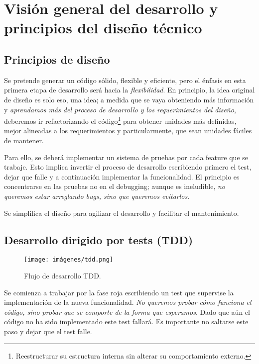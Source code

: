 
\section{Visión general del desarrollo y principios del diseño técnico}\label{principios:vision-general-desarrollo}

\subsection{Principios de diseño}\label{principios:principios-de-diseno}
Se pretende generar un código sólido, flexible y eficiente, pero el énfasis en esta primera etapa de desarrollo será hacia la \emph{flexibilidad}. En principio, la idea original de diseño es solo eso, una idea; a medida que se vaya obteniendo más información y \emph{aprendamos más del proceso de desarrollo y los requerimientos del diseño}, deberemos ir refactorizando el código\footnote{Reestructurar su estructura interna sin alterar su comportamiento externo.} para obtener unidades más definidas, mejor alineadas a los requerimientos y particularmente, que sean unidades fáciles de mantener.

Para ello, se deberá implementar un sistema de pruebas por cada feature que se trabaje. Esto implica invertir el proceso de desarrollo escribiendo primero el test, dejar que falle y a continuación implementar la funcionalidad. El principio es concentrarse en las pruebas no en el \foreignlanguage{english}{debugging}; aunque es ineludible, \emph{no queremos estar arreglando bugs, sino que queremos evitarlos}.

Se simplifica el diseño para agilizar el desarrollo y facilitar el mantenimiento.

\subsection{Desarrollo dirigido por tests (TDD)}\label{principios:TDD}

\begin{figure}[ht]
	\centering
	\texttt{[image: imágenes/tdd.png]}
	\caption{Flujo de desarrollo TDD.}
\end{figure}

Se comienza a trabajar por la fase roja escribiendo un test que supervise la implementación de la nueva funcionalidad. \emph{No queremos probar cómo funciona el código, sino probar que se comporte de la forma que esperamos}. Dado que aún el código no ha sido implementado este test fallará. Es importante no saltarse este paso y dejar que el test falle.

